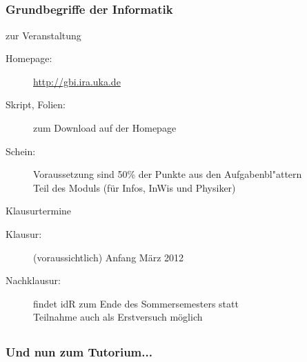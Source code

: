 \subsection*{}
\begin{frame}
        \frametitle{Grundbegriffe der Informatik}
        \begin{block}{zur Veranstaltung}
                \begin{description}
                \item[Homepage:] \url{http://gbi.ira.uka.de}
                \item[Skript, Folien:] zum Download auf der Homepage
                \item[Schein:] Voraussetzung sind 50\% der Punkte aus den Aufgabenbl"attern\\  Teil des Moduls (für Infos, InWis und Physiker)
                \end{description}
        \end{block}

        \vspace{2ex}

        \begin{block}{Klausurtermine}
                \begin{description}
                  \item[Klausur:] (voraussichtlich) Anfang März 2012
                  \item[Nachklausur:] findet idR zum Ende des Sommersemesters statt\\
                          Teilnahme auch als Erstversuch möglich
                \end{description}
        \end{block}
\end{frame}

\subsection*{}
\begin{frame}
        \frametitle{Und nun zum Tutorium...}
 \end{frame}

